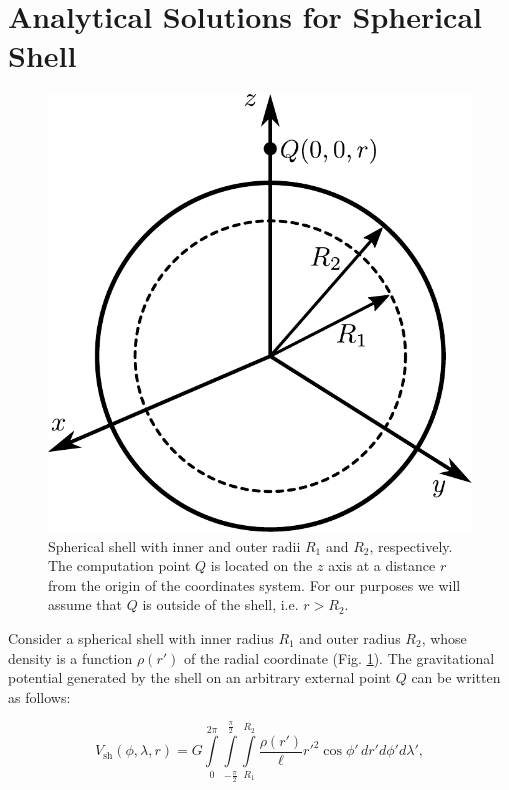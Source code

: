 \documentclass[extra]{gji}
\begin{document}




\appendix

\section{Analytical Solutions for Spherical Shell}
\label{sec:shell}

\begin{figure}
\centering
\includegraphics[width=0.7\linewidth]{figures/spherical-shell.pdf}
\caption{
    Spherical shell with inner and outer radii $R_1$ and $R_2$, respectively.
    The computation point $Q$ is located on the $z$ axis at a distance $r$ from
    the origin of the coordinates system.
    For our purposes we will assume that $Q$ is outside of the shell,
    i.e. $r > R_2$.
}
\label{fig:spherical-shell}
\end{figure}

Consider a spherical shell with inner radius $R_1$ and outer radius $R_2$,
whose density is a function $\rho(r')$ of the radial coordinate
(Fig. \ref{fig:spherical-shell}).
The gravitational potential generated by the shell on an arbitrary external
point $Q$ can be written as follows:

\begin{equation}
    V_\text{sh}(\phi, \lambda, r) = G
    \int\limits_0^{2\pi}
    \int\limits_{-\frac{\pi}{2}}^\frac{\pi}{2}
    \int\limits_{R_1}^{R_2}
    \frac{\rho(r')}{\ell} {r'}^2 \cos\phi' \,
    dr' d\phi' d\lambda',
\end{equation}
\end{document}
